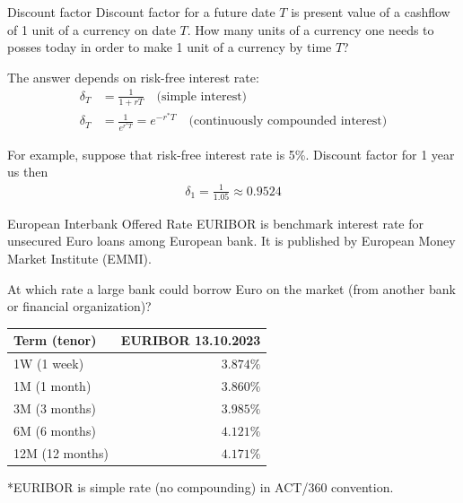 \documentclass{beamer}
\begin{document}
\begin{frame}{Discount factor}
\justify
\alert{Discount factor} for a future date $T$ is present value of a cashflow of 1 unit of a currency on date $T$. How many units of a currency one needs to posses today in order to make 1 unit of a currency by time $T$?

\justify
The answer depends on risk-free interest rate:
\begin{align*}
\delta_T &= \frac{1}{1 + rT} \quad \text{(simple interest)} \\
\delta_T &= \frac{1}{e^{r^*T}} = e^{-r^*T} \quad \text{(continuously compounded interest)}
\end{align*}

\justify
For example, suppose that risk-free interest rate is 5\%.  Discount factor for 1 year us then
\begin{align*}
\delta_1 = \frac{1}{1.05} \approx 0.9524
\end{align*}
\end{frame}



\begin{frame}{European Interbank Offered Rate}
\justify
\alert{EURIBOR} is benchmark interest rate for unsecured Euro loans among European bank. It is published by European Money Market Institute (EMMI).

\justify
At which rate a large bank could borrow Euro on the market (from another bank or financial organization)?

\justify
\centering
\begin{tabular}{l|r}
Term (tenor)     & EURIBOR 13.10.2023 \\ \hline
1W (1 week)    & $3.874\%$ \\
1M (1 month)     & $3.860\%$ \\
3M (3 months)    & $3.985\%$ \\
6M (6 months)   & $4.121\%$ \\
12M (12 months) & $4.171\%$ 
\end{tabular}

\justify
*EURIBOR is simple rate (no compounding) in ACT/360 convention.
\end{frame}
\end{document}
